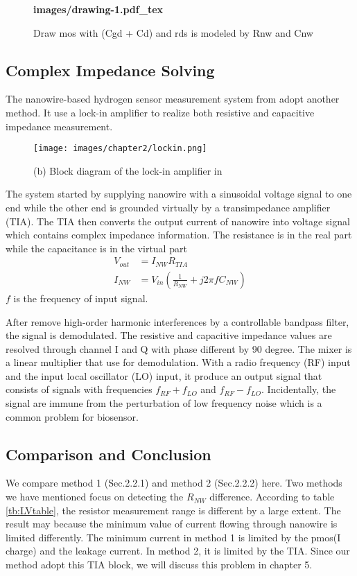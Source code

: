 \begin{figure}[!htbp]
    \centering
    {\selectfont\textbf{
        \def\svgwidth{5.0cm}
        \fontsize{6}{7}\selectfont
         {images/drawing-1.pdf_tex}
    }}
    \fontsize{6}{7}\selectfont
    \caption{Draw mos with (Cgd + Cd) and rds is modeled by Rnw and Cnw}
    \label{fig:tot_mos}
\end{figure}

\subsection{Complex Impedance Solving}
The nanowire-based hydrogen sensor measurement system from \cite{Jlockin} adopt another method.
It use a lock-in amplifier to realize both resistive and capacitive impedance measurement.

\begin{figure}[!htbp]
        \centering
        \texttt{[image: images/chapter2/lockin.png]}
        \caption{(b) Block diagram of the lock-in amplifier in \cite{Jlockin}}
        \label{fig:lockin}
\end{figure}

The system started by supplying nanowire with a sinusoidal voltage signal to one end while the other end is grounded virtually by a transimpedance amplifier (TIA).
The TIA then converts the output current of nanowire into voltage signal which contains complex impedance information.
The resistance is in the real part while the capacitance is in the virtual part
\setlength{\mathindent}{5.5cm}
\begin{align}
    V_{out} &= I_{NW}R_{TIA} \\
    I_{NW} &= V_{in}(\frac{1}{R_{NW}} + j 2\pi fC_{NW})
\end{align}
$f$ is the frequency of input signal.

After remove high-order harmonic interferences by a controllable bandpass filter, the signal is demodulated.
The resistive and capacitive impedance values are resolved through channel I and Q with phase different by 90 degree.
The mixer is a linear multiplier that use for demodulation.
With a radio frequency (RF) input and the input local oscillator (LO) input, it produce an output signal that consists of signals with frequencies $f_{RF} + f_{LO}$ and $f_{RF} - f_{LO}$.
Incidentally, the signal are immune from the perturbation of low frequency noise which is a common problem for biosensor.

\subsection{Comparison and Conclusion}
We compare method 1 (Sec.2.2.1) and method 2 (Sec.2.2.2) here.
Two methods we have mentioned focus on detecting the $R_{NW}$ difference.
According to table \ref{tb:LVtable}, the resistor measurement range is different by a large extent.
The result may because the minimum value of current flowing through nanowire is limited differently.
The minimum current in method 1 is limited by the pmos(I charge) and the leakage current.
In method 2, it is limited by the TIA.
Since our method adopt this TIA block, we will discuss this problem in chapter 5.

